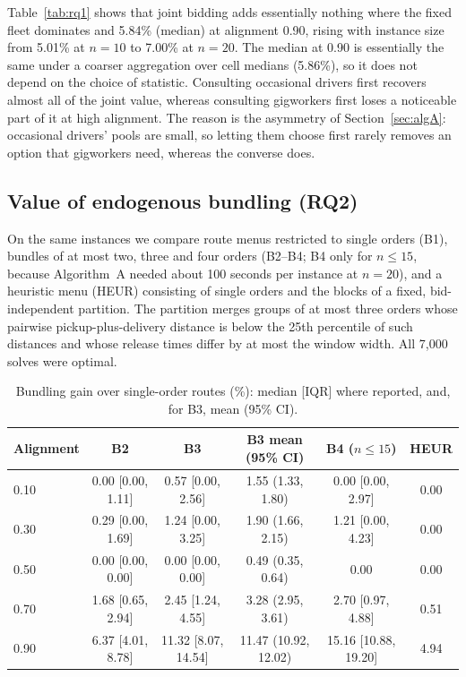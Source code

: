 \documentclass[review,12pt]{elsarticle}
\theoremstyle{definition}
\theoremstyle{remark}
\begin{document}
Table~\ref{tab:rq1} shows that joint bidding adds essentially nothing where
the fixed fleet dominates and 5.84\% (median) at alignment 0.90, rising with
instance size from 5.01\% at $n=10$ to 7.00\% at $n=20$. The median at 0.90
is essentially the same under a coarser aggregation over cell medians
(5.86\%), so it does not depend on the choice of statistic. Consulting
occasional drivers first recovers almost all of the joint value, whereas
consulting gigworkers first loses a noticeable part of it at high alignment.
The reason is the asymmetry of Section~\ref{sec:algA}: occasional drivers'
pools are small, so letting them choose first rarely removes an option that
gigworkers need, whereas the converse does.

\subsection{Value of endogenous bundling (RQ2)}

On the same instances we compare route menus restricted to single orders
(B1), bundles of at most two, three and four orders (B2--B4; B4 only for
$n\le15$, because Algorithm~A needed about 100 seconds per instance at
$n=20$), and a heuristic menu (HEUR) consisting of single orders and the
blocks of a fixed, bid-independent partition. The partition merges groups of
at most three orders whose pairwise pickup-plus-delivery distance is below
the 25th percentile of such distances and whose release times differ by at
most the window width. All 7,000 solves were optimal.

\begin{table}[t]
\centering
\caption{Bundling gain over single-order routes (\%): median [IQR] where reported, and, for B3, mean (95\% CI).}
\label{tab:rq2}
\footnotesize
\setlength{\tabcolsep}{4pt}
\begin{tabular}{lccccc}
\toprule
Alignment & B2 & B3 & B3 mean (95\% CI) & B4 ($n\le15$) & HEUR\\
\midrule
0.10 & 0.00 [0.00, 1.11] & 0.57 [0.00, 2.56] & 1.55 (1.33, 1.80) & 0.00 [0.00, 2.97] & 0.00\\
0.30 & 0.29 [0.00, 1.69] & 1.24 [0.00, 3.25] & 1.90 (1.66, 2.15) & 1.21 [0.00, 4.23] & 0.00\\
0.50 & 0.00 [0.00, 0.00] & 0.00 [0.00, 0.00] & 0.49 (0.35, 0.64) & 0.00 & 0.00\\
0.70 & 1.68 [0.65, 2.94] & 2.45 [1.24, 4.55] & 3.28 (2.95, 3.61) & 2.70 [0.97, 4.88] & 0.51\\
0.90 & 6.37 [4.01, 8.78] & 11.32 [8.07, 14.54] & 11.47 (10.92, 12.02) & 15.16 [10.88, 19.20] & 4.94\\
\bottomrule
\end{tabular}
\end{table}
\end{document}
